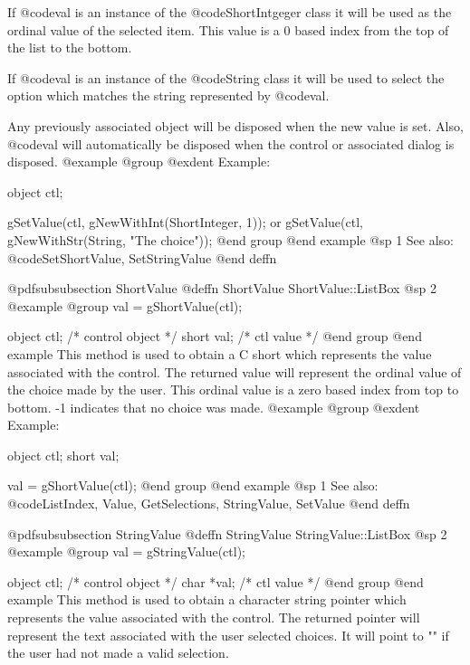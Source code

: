 If @code{val} is an instance of the @code{ShortIntgeger} class it will be
used as the ordinal value of the selected item.  This value is a 0 based
index from the top of the list to the bottom.

If @code{val} is an instance of the @code{String} class it will be used
to select the option which matches the string represented by @code{val}.

Any previously associated object will be disposed when the new value is set.
Also, @code{val} will automatically be disposed when the control or associated
dialog is disposed.
@example
@group
@exdent Example:

object  ctl;

gSetValue(ctl, gNewWithInt(ShortInteger, 1));
        or
gSetValue(ctl, gNewWithStr(String, "The choice"));
@end group
@end example
@sp 1
See also:  @code{SetShortValue, SetStringValue}
@end deffn













@pdfsubsubsection {ShortValue}
@deffn {ShortValue} ShortValue::ListBox
@sp 2
@example
@group
val = gShortValue(ctl);

object  ctl;   /*  control object  */
short   val;   /*  ctl value       */
@end group
@end example
This method is used to obtain a C short which represents the value
associated with the control.  The returned value will represent the
ordinal value of the choice made by the user.  This ordinal value is a
zero based index from top to bottom.  -1 indicates that no choice was
made.
@example
@group
@exdent Example:

object  ctl;
short   val;

val = gShortValue(ctl);
@end group
@end example
@sp 1
See also:  @code{ListIndex, Value, GetSelections, StringValue, SetValue}
@end deffn










@pdfsubsubsection {StringValue}
@deffn {StringValue} StringValue::ListBox
@sp 2
@example
@group
val = gStringValue(ctl);

object  ctl;   /*  control object  */
char    *val;  /*  ctl value       */
@end group
@end example
This method is used to obtain a character string pointer which
represents the value associated with the control.  The returned pointer
will represent the text associated with the user selected choices.
It will point to "" if the user had not made a valid selection.

